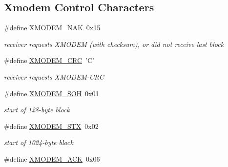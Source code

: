 \subsection*{Xmodem Control Characters}
\begin{DoxyCompactItemize}
\item 
\hypertarget{group__util__xmodem_ga23d8e7fbbf55d1899984aad6f2dd0c77}{\#define \hyperlink{group__util__xmodem_ga23d8e7fbbf55d1899984aad6f2dd0c77}{X\-M\-O\-D\-E\-M\-\_\-\-N\-A\-K}~0x15}\label{group__util__xmodem_ga23d8e7fbbf55d1899984aad6f2dd0c77}

\begin{DoxyCompactList}\small\item\em receiver requests X\-M\-O\-D\-E\-M (with checksum), or did not receive last block \end{DoxyCompactList}\item 
\hypertarget{group__util__xmodem_ga5a28173b1f4d064e2b81c71394fe0d82}{\#define \hyperlink{group__util__xmodem_ga5a28173b1f4d064e2b81c71394fe0d82}{X\-M\-O\-D\-E\-M\-\_\-\-C\-R\-C}~'C'}\label{group__util__xmodem_ga5a28173b1f4d064e2b81c71394fe0d82}

\begin{DoxyCompactList}\small\item\em receiver requests X\-M\-O\-D\-E\-M-\/\-C\-R\-C \end{DoxyCompactList}\item 
\hypertarget{group__util__xmodem_ga516766421552c726b2859228d39b867e}{\#define \hyperlink{group__util__xmodem_ga516766421552c726b2859228d39b867e}{X\-M\-O\-D\-E\-M\-\_\-\-S\-O\-H}~0x01}\label{group__util__xmodem_ga516766421552c726b2859228d39b867e}

\begin{DoxyCompactList}\small\item\em start of 128-\/byte block \end{DoxyCompactList}\item 
\hypertarget{group__util__xmodem_ga743b9b571f66fa34a38f8c23407a206f}{\#define \hyperlink{group__util__xmodem_ga743b9b571f66fa34a38f8c23407a206f}{X\-M\-O\-D\-E\-M\-\_\-\-S\-T\-X}~0x02}\label{group__util__xmodem_ga743b9b571f66fa34a38f8c23407a206f}

\begin{DoxyCompactList}\small\item\em start of 1024-\/byte block \end{DoxyCompactList}\item 
\hypertarget{group__util__xmodem_ga15cc4ebc5babe213c14409b8dcc08151}{\#define \hyperlink{group__util__xmodem_ga15cc4ebc5babe213c14409b8dcc08151}{X\-M\-O\-D\-E\-M\-\_\-\-A\-C\-K}~0x06}\label{group__util__xmodem_ga15cc4ebc5babe213c14409b8dcc08151}


\end{DoxyCompactItemize}
